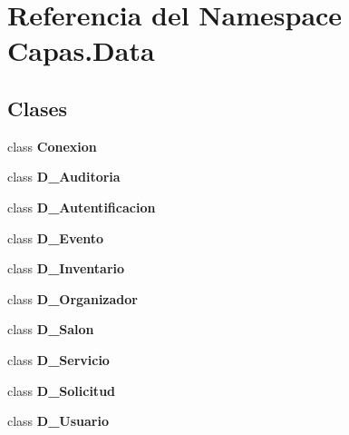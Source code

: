 \section{Referencia del Namespace Capas.\+Data}
\label{namespace_capas_1_1_data}
\subsection*{Clases}
\begin{DoxyCompactItemize}
\item 
class {\bf Conexion}
\item 
class {\bf D\+\_\+\+Auditoria}
\item 
class {\bf D\+\_\+\+Autentificacion}
\item 
class {\bf D\+\_\+\+Evento}
\item 
class {\bf D\+\_\+\+Inventario}
\item 
class {\bf D\+\_\+\+Organizador}
\item 
class {\bf D\+\_\+\+Salon}
\item 
class {\bf D\+\_\+\+Servicio}
\item 
class {\bf D\+\_\+\+Solicitud}
\item 
class {\bf D\+\_\+\+Usuario}
\end{DoxyCompactItemize}
